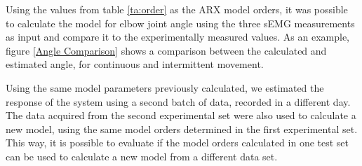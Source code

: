 \documentclass[letterpaper, 10 pt, conference]{ieeeconf}  %
\begin{document}
Using the values from table \ref{ta:order} as the ARX model orders, it was possible to calculate the model for elbow joint angle using the three sEMG measurements as input and compare it to the experimentally measured values. As an example, figure \ref{Angle Comparison} shows a comparison between the calculated and estimated angle, for continuous and intermittent movement.

Using the same model parameters previously calculated, we estimated the response of the system using a second batch of data, recorded in a different day. %
The data acquired from the second experimental set were also used to calculate a new model, using the same model orders determined in the first experimental set. This way, it is possible to evaluate if the model orders calculated in one test set can be used to calculate a new model from a different data set.
\end{document}
